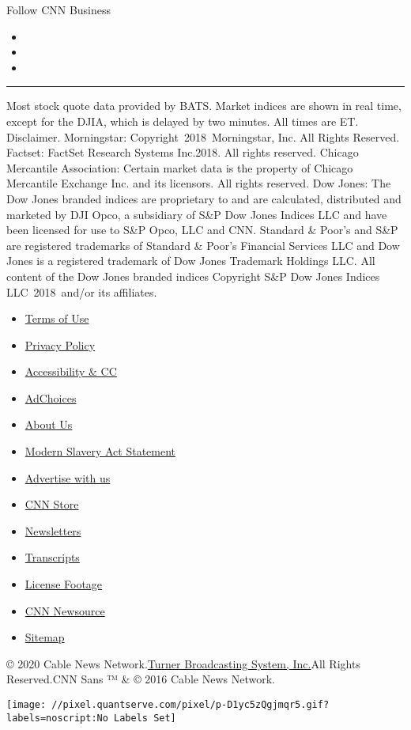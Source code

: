 Follow CNN Business

\begin{itemize}
\item
\item
\item
\end{itemize}

\begin{center}\rule{0.5\linewidth}{\linethickness}\end{center}

Most stock quote data provided by BATS. Market indices are shown in real
time, except for the DJIA, which is delayed by two minutes. All times
are ET. Disclaimer. Morningstar: Copyright~2018~Morningstar, Inc. All
Rights Reserved. Factset: FactSet Research Systems Inc.2018. All rights
reserved. Chicago Mercantile Association: Certain market data is the
property of Chicago Mercantile Exchange Inc. and its licensors. All
rights reserved. Dow Jones: The Dow Jones branded indices are
proprietary to and are calculated, distributed and marketed by DJI Opco,
a subsidiary of S\&P Dow Jones Indices LLC and have been licensed for
use to S\&P Opco, LLC and CNN. Standard \& Poor's and S\&P are
registered trademarks of Standard \& Poor's Financial Services LLC and
Dow Jones is a registered trademark of Dow Jones Trademark Holdings LLC.
All content of the Dow Jones branded indices Copyright S\&P Dow Jones
Indices LLC~2018~and/or its affiliates.

\begin{itemize}
\tightlist
\item
  \href{/terms}{Terms of Use}
\item
  \href{/privacy}{Privacy Policy}
\item
  \href{/accessibility}{Accessibility \& CC}
\item
  \protect\hyperlink{}{AdChoices}
\item
  \href{/about}{About Us}
\item
  \href{/msa}{Modern Slavery Act Statement}
\item
  \href{https://commercial.cnn.com}{Advertise with us}
\item
  \href{//store.cnn.com}{CNN Store}
\item
  \href{/newsletters}{Newsletters}
\item
  \href{/transcripts}{Transcripts}
\item
  \href{/collection}{License Footage}
\item
  \href{http://cnnnewsource.com}{CNN Newsource}
\item
  \href{https://www.cnn.com/sitemap.html}{Sitemap}
\end{itemize}

© 2020 Cable News Network.\href{//www.turner.com}{Turner Broadcasting
System, Inc.}All Rights Reserved.CNN Sans ™ \& © 2016 Cable News
Network.

\texttt{[image: //pixel.quantserve.com/pixel/p-D1yc5zQgjmqr5.gif?labels=noscript:No Labels Set]}
